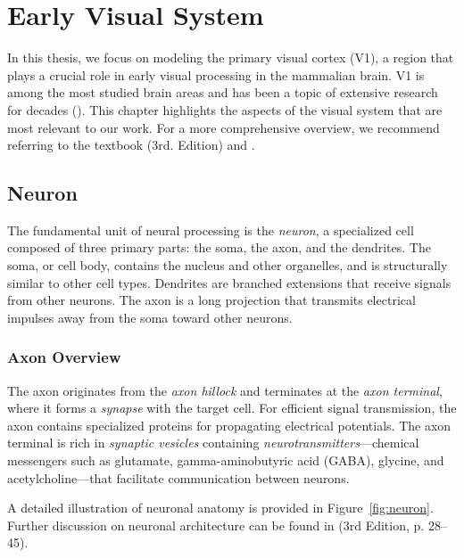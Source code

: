 \chapter{Early Visual System}
\label{chap:visual_system}

In this thesis, we focus on modeling the primary visual cortex (V1), a region that plays a crucial role in early visual processing in the mammalian brain. V1 is among the most studied brain areas and has been a topic of extensive research for decades (\citet{hubel1965receptive}). This chapter highlights the aspects of the visual system that are most relevant to our work. For a more comprehensive overview, we recommend referring to the textbook \citet{bear2020neuroscience} (3rd. Edition) and \citet{goebel2004visual}.

\section{Neuron}
\label{sec:neuron}

The fundamental unit of neural processing is the \emph{neuron}, a specialized cell composed of three primary parts: the soma, the axon, and the dendrites. The soma, or cell body, contains the nucleus and other organelles, and is structurally similar to other cell types. Dendrites are branched extensions that receive signals from other neurons. The axon is a long projection that transmits electrical impulses away from the soma toward other neurons.

\subsection{Axon Overview}
\label{subsec:axon}

The axon originates from the \emph{axon hillock} and terminates at the \emph{axon terminal}, where it forms a \emph{synapse} with the target cell. For efficient signal transmission, the axon contains specialized proteins for propagating electrical potentials. The axon terminal is rich in \emph{synaptic vesicles} containing \emph{neurotransmitters}—chemical messengers such as glutamate, gamma-aminobutyric acid (GABA), glycine, and acetylcholine—that facilitate communication between neurons.

A detailed illustration of neuronal anatomy is provided in Figure~\ref{fig:neuron}. Further discussion on neuronal architecture can be found in \citet{bear2020neuroscience} (3rd Edition, p. 28--45).

